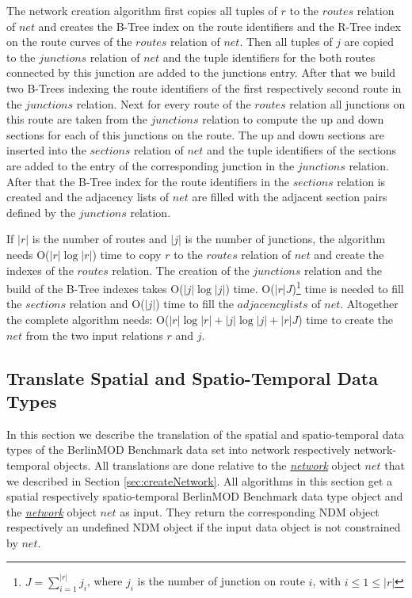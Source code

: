 \documentclass[a4paper]{article}
\newcommand{\bmodb} {BerlinMOD Benchmark}
\newcommand{\dt}[1]{\textsl{\underline{#1}}}
\begin{document}
The network creation algorithm first copies all tuples of $r$ to the
$routes$ relation of $net$ and creates the B-Tree index on the route
identifiers and the R-Tree index on the route curves of the $routes$ relation of
$net$. Then all tuples of $j$ are copied to the $junctions$ relation
of $net$ and the tuple identifiers for the both routes connected
by this junction are added to the junctions entry. After that we build two B-Trees
indexing the route identifiers of the first respectively second route in the
$junctions$ relation. Next for every route of the $routes$ relation all junctions
on this route are taken from the $junctions$ relation to compute the up and
down sections for each of this junctions on the route. The up and down
sections are inserted into the $sections$ relation of $net$ and the
tuple identifiers of the sections are added to the entry of the corresponding
junction in the $junctions$ relation. After that the B-Tree index for the
route identifiers in the $sections$ relation is created and the adjacency
lists of $net$ are filled with the adjacent section pairs defined by the
$junctions$ relation.

If $|r|$ is the number of routes and $|j|$ is the number of junctions,
the algorithm needs O($|r| \log |r|$) time to copy $r$ to the
$routes$ relation of $net$ and create the indexes of the
$routes$ relation. The creation of the $junctions$ relation and the build
of the B-Tree indexes takes O($|j| \log |j|$) time.
O($|r|J$)\footnote{$J = \sum_{i=1}^{|r|}{j_i}$, where $j_i$ is the number of
junction on route $i$, with $i \leq 1 \leq |r|$} time is needed to fill the
$sections$ relation and O($|j|$) time to fill the $adjacency lists$ of $net$.
Altogether the complete algorithm needs:
O($|r| \log |r|+|j| \log |j| + |r|J$) time to create the $net$ from the two input
relations $r$ and $j$.
\subsection{Translate Spatial and Spatio-Temporal Data Types}
\label{sec:translateSTdata}
In this section we describe the translation of the spatial and spatio-temporal
data types of the \bmodb{} data set into network respectively network-temporal
objects. All translations are done relative to the \dt{network} object $net$ that
we described in Section \ref{sec:createNetwork}.
All algorithms in this section get a spatial respectively spatio-temporal \bmodb{}
data type object and the \dt{network} object $net$ as input. They return the
corresponding NDM object respectively an undefined NDM object if the input data
object is not constrained by $net$.
\end{document}
